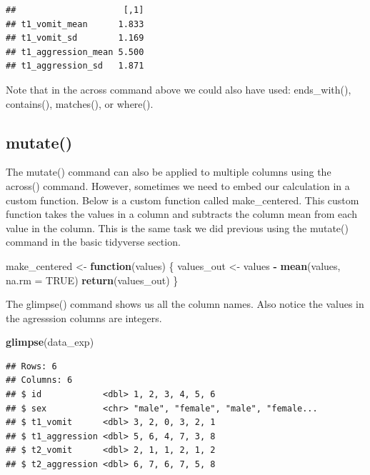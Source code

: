 \documentclass[
]{krantz}
\makeatletter
\newenvironment{Shaded}{\begin{snugshade}}{\end{snugshade}}
\newcommand{\ControlFlowTok}[1]{\textcolor[rgb]{0.27,0.27,0.27}{\textbf{#1}}}
\newcommand{\DataTypeTok}[1]{\textcolor[rgb]{0.27,0.27,0.27}{#1}}
\newcommand{\KeywordTok}[1]{\textcolor[rgb]{0.27,0.27,0.27}{\textbf{#1}}}
\newcommand{\NormalTok}[1]{#1}
\newcommand{\OperatorTok}[1]{\textcolor[rgb]{0.43,0.43,0.43}{\textbf{#1}}}
\newcommand{\OtherTok}[1]{\textcolor[rgb]{0.37,0.37,0.37}{#1}}
\newcommand{\StringTok}[1]{\textcolor[rgb]{0.5,0.5,0.5}{#1}}
\newenvironment{kframe}{%
\medskip{}
\setlength{\fboxsep}{.8em}
 \def\at@end@of@kframe{}%
 \ifinner\ifhmode%
  \def\at@end@of@kframe{\end{minipage}}%
  \begin{minipage}{\columnwidth}%
 \fi\fi%
 \def\FrameCommand##1{\hskip\@totalleftmargin \hskip-\fboxsep
 \colorbox{shadecolor}{##1}\hskip-\fboxsep
     \hskip-\linewidth \hskip-\@totalleftmargin \hskip\columnwidth}%
 \MakeFramed {\advance\hsize-\width
   \@totalleftmargin\z@ \linewidth\hsize
   \@setminipage}}%
 {\par\unskip\endMakeFramed%
 \at@end@of@kframe}
\renewenvironment{Shaded}{\begin{kframe}}{\end{kframe}}
\makeatother
\begin{document}
\begin{verbatim}
##                     [,1]
## t1_vomit_mean      1.833
## t1_vomit_sd        1.169
## t1_aggression_mean 5.500
## t1_aggression_sd   1.871
\end{verbatim}

Note that in the across command above we could also have used: ends\_with(), contains(), matches(), or where().

\hypertarget{mutate-1}{%
\subsection{mutate()}\label{mutate-1}}

The mutate() command can also be applied to multiple columns using the across() command. However, sometimes we need to embed our calculation in a custom function. Below is a custom function called make\_centered. This custom function takes the values in a column and subtracts the column mean from each value in the column. This is the same task we did previous using the mutate() command in the basic tidyverse section.

\begin{Shaded}
\begin{Highlighting}[]
\NormalTok{make_centered <-}\StringTok{ }\ControlFlowTok{function}\NormalTok{(values) \{}
\NormalTok{  values_out <-}\StringTok{ }\NormalTok{values }\OperatorTok{-}\StringTok{ }\KeywordTok{mean}\NormalTok{(values, }\DataTypeTok{na.rm =} \OtherTok{TRUE}\NormalTok{)}
  \KeywordTok{return}\NormalTok{(values_out)}
\NormalTok{\}}
\end{Highlighting}
\end{Shaded}

The glimpse() command shows us all the column names. Also notice the values in the agresssion columns are integers.

\begin{Shaded}
\begin{Highlighting}[]
\KeywordTok{glimpse}\NormalTok{(data_exp)}
\end{Highlighting}
\end{Shaded}

\begin{verbatim}
## Rows: 6
## Columns: 6
## $ id            <dbl> 1, 2, 3, 4, 5, 6
## $ sex           <chr> "male", "female", "male", "female...
## $ t1_vomit      <dbl> 3, 2, 0, 3, 2, 1
## $ t1_aggression <dbl> 5, 6, 4, 7, 3, 8
## $ t2_vomit      <dbl> 2, 1, 1, 2, 1, 2
## $ t2_aggression <dbl> 6, 7, 6, 7, 5, 8
\end{verbatim}
\end{document}
